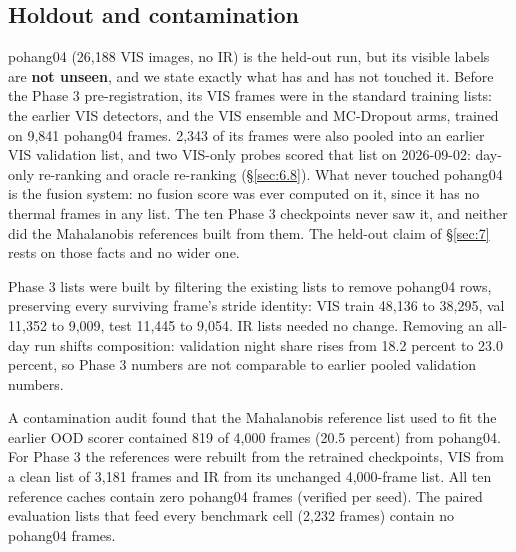 \documentclass[10pt]{article}
\begin{document}
\subsection{Holdout and contamination}\label{app:B.5}
pohang04 (26,188 VIS images, no IR) is the held-out run, but its visible labels are \textbf{not unseen}, and we state exactly what has and has not touched it. Before the Phase 3 pre-registration, its VIS frames were in the standard training lists: the earlier VIS detectors, and the VIS ensemble and MC-Dropout arms, trained on 9,841 pohang04 frames. 2,343 of its frames were also pooled into an earlier VIS validation list, and two VIS-only probes scored that list on 2026-09-02: day-only re-ranking and oracle re-ranking (\S\ref{sec:6.8}). What never touched pohang04 is the fusion system: no fusion score was ever computed on it, since it has no thermal frames in any list. The ten Phase 3 checkpoints never saw it, and neither did the Mahalanobis references built from them. The held-out claim of \S\ref{sec:7} rests on those facts and no wider one.

Phase 3 lists were built by filtering the existing lists to remove pohang04 rows, preserving every surviving frame's stride identity: VIS train 48,136 to 38,295, val 11,352 to 9,009, test 11,445 to 9,054. IR lists needed no change. Removing an all-day run shifts composition: validation night share rises from 18.2 percent to 23.0 percent, so Phase 3 numbers are not comparable to earlier pooled validation numbers.

A contamination audit found that the Mahalanobis reference list used to fit the earlier OOD scorer contained 819 of 4,000 frames (20.5 percent) from pohang04. For Phase 3 the references were rebuilt from the retrained checkpoints, VIS from a clean list of 3,181 frames and IR from its unchanged 4,000-frame list. All ten reference caches contain zero pohang04 frames (verified per seed). The paired evaluation lists that feed every benchmark cell (2,232 frames) contain no pohang04 frames.

\FloatBarrier
\end{document}
